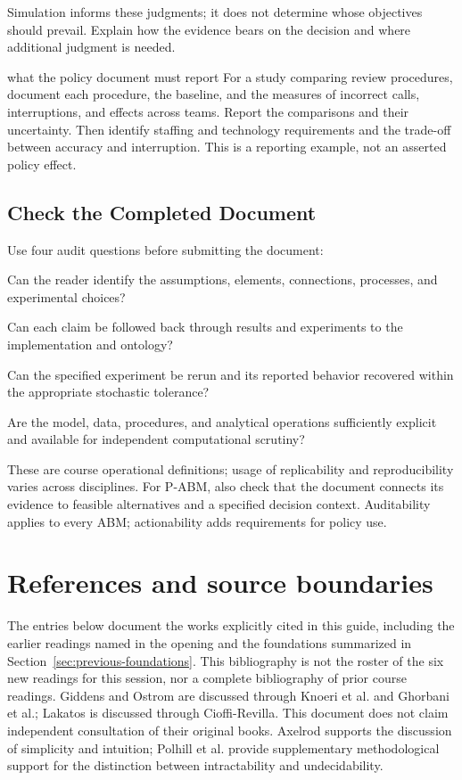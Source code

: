 \documentclass[11pt,a4paper]{article}
\begin{document}
Simulation informs these judgments; it does not determine whose objectives should prevail. Explain how the evidence bears on the decision and where additional judgment is needed.

\begin{soccer}{what the policy document must report}
For a study comparing review procedures, document each procedure, the baseline, and the measures of incorrect calls, interruptions, and effects across teams. Report the comparisons and their uncertainty. Then identify staffing and technology requirements and the trade-off between accuracy and interruption. This is a reporting example, not an asserted policy effect.
\end{soccer}

\subsection{Check the Completed Document}

Use four audit questions before submitting the document:
\begin{description}[style=nextline,leftmargin=0pt,itemsep=4pt]
\item[Transparency] Can the reader identify the assumptions, elements, connections, processes, and experimental choices?
\item[Traceability] Can each claim be followed back through results and experiments to the implementation and ontology?
\item[Replicability] Can the specified experiment be rerun and its reported behavior recovered within the appropriate stochastic tolerance?
\item[Reproducibility] Are the model, data, procedures, and analytical operations sufficiently explicit and available for independent computational scrutiny?
\end{description}
These are course operational definitions; usage of replicability and reproducibility varies across disciplines. For P-ABM, also check that the document connects its evidence to feasible alternatives and a specified decision context. Auditability applies to every ABM; actionability adds requirements for policy use.

\clearpage
\section*{References and source boundaries}
The entries below document the works explicitly cited in this guide, including the earlier readings named in the opening and the foundations summarized in Section~\ref{sec:previous-foundations}. This bibliography is not the roster of the six new readings for this session, nor a complete bibliography of prior course readings. Giddens and Ostrom are discussed through Knoeri et al. and Ghorbani et al.; Lakatos is discussed through Cioffi-Revilla. This document does not claim independent consultation of their original books. Axelrod supports the discussion of simplicity and intuition; Polhill et al. provide supplementary methodological support for the distinction between intractability and undecidability.
\end{document}
